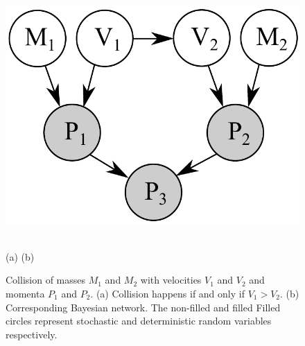 \documentclass{article}
\begin{document}
\begin{figure}
\begin{center}
\begin{minipage}{\linewidth/6}
\end{minipage}
\hspace{7mm}
\begin{minipage}{\linewidth/2}
                \includegraphics[width=0.80\linewidth]{Figs/little-momentum1.pdf}
\end{minipage}
\vspace{3mm}\\
(a) \hspace{25mm}(b)
\caption{\footnotesize 
Collision of masses $M_1$ and $M_2$ with velocities $V_1$ and $V_2$ and momenta $P_1$ and $P_2$. 
(a) Collision happens if and only if $V_1>V_2$. (b) Corresponding Bayesian network. The non-filled and filled Filled circles represent stochastic and deterministic random variables respectively.} 
\label{fig:mom2}
\vspace{-4mm}

\end{center}
\end{figure}

\end{document}

